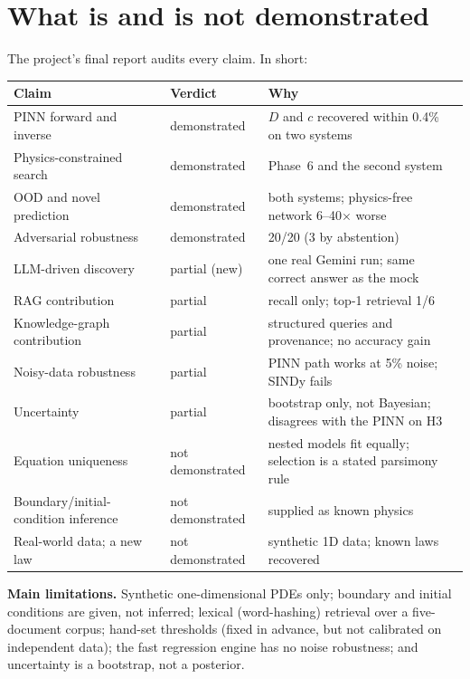 \section{What is and is not demonstrated}\label{sec:limits}

The project's final report audits every claim. In short:
\begin{center}
\small
\begin{tabular}{@{}p{4.2cm}p{3.2cm}p{7.2cm}@{}}
\toprule
\textbf{Claim} & \textbf{Verdict} & \textbf{Why} \\ \midrule
PINN forward and inverse & demonstrated & $D$ and $c$ recovered within 0.4\% on two systems \\
Physics-constrained search & demonstrated & Phase~6 and the second system \\
OOD and novel prediction & demonstrated & both systems; physics-free network 6--40$\times$ worse \\
Adversarial robustness & demonstrated & 20/20 (3 by abstention) \\
LLM-driven discovery & partial (new) & one real Gemini run; same correct answer as the mock \\
RAG contribution & partial & recall only; top-1 retrieval 1/6 \\
Knowledge-graph contribution & partial & structured queries and provenance; no accuracy gain \\
Noisy-data robustness & partial & PINN path works at 5\% noise; SINDy fails \\
Uncertainty & partial & bootstrap only, not Bayesian; disagrees with the PINN on H3 \\
Equation uniqueness & not demonstrated & nested models fit equally; selection is a stated parsimony rule \\
Boundary/initial-condition inference & not demonstrated & supplied as known physics \\
Real-world data; a new law & not demonstrated & synthetic 1D data; known laws recovered \\
\bottomrule
\end{tabular}
\end{center}

\textbf{Main limitations.} Synthetic one-dimensional PDEs only; boundary and initial conditions are given, not
inferred; lexical (word-hashing) retrieval over a five-document corpus; hand-set thresholds (fixed in advance, but
not calibrated on independent data); the fast regression engine has no noise robustness; and uncertainty is a
bootstrap, not a posterior.


